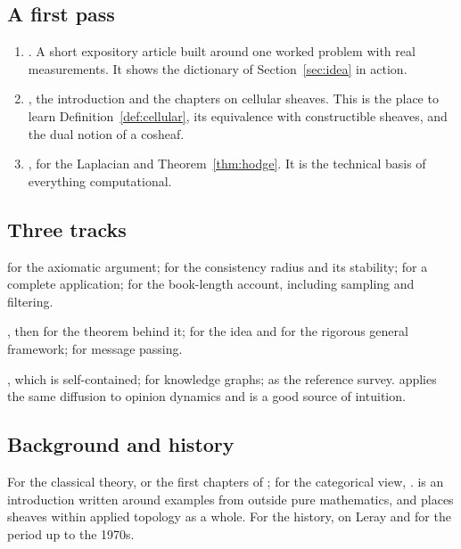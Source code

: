 \documentclass[11pt,a4paper,oneside]{scrartcl}
\theoremstyle{guideplain}
\theoremstyle{guidedef}
\begin{document}
\subsection{A first pass}
\begin{enumerate}
  \item \textcite{robinson2019}. A short expository article built around one worked problem with
        real measurements. It shows the dictionary of Section~\ref{sec:idea} in action.
  \item \textcite{curry2014}, the introduction and the chapters on cellular sheaves. This is the
        place to learn Definition~\ref{def:cellular}, its equivalence with constructible sheaves,
        and the dual notion of a cosheaf.
  \item \textcite{hansen2019}, for the Laplacian and Theorem~\ref{thm:hodge}. It is the technical
        basis of everything computational.
\end{enumerate}

\subsection{Three tracks}
\begin{description}[style=nextline, leftmargin=1.4em, itemsep=.5em]
  \item[Data fusion] \textcite{robinson2017} for the axiomatic argument; \textcite{robinson2020} for
        the consistency radius and its stability; \textcite{joslyn2020} for a complete application;
        \textcite{robinson2014} for the book-length account, including sampling and filtering.
  \item[Information theory] \textcite{abramsky2011}, then \textcite{vorobev1962} for the theorem
        behind it; \textcite{baudot2015} for the idea and \textcite{vigneaux2020} for the rigorous
        general framework; \textcite{peltre2020} for message passing.
  \item[Machine learning] \textcite{bodnar2022}, which is self-contained; \textcite{gebhart2023} for
        knowledge graphs; \textcite{ayzenberg2025} as the reference survey. \textcite{hansen2021}
        applies the same diffusion to opinion dynamics and is a good source of intuition.
\end{description}

\subsection{Background and history}
For the classical theory, \textcite{bredon1997} or the first chapters of \textcite{kashiwara1990};
for the categorical view, \textcite{maclane1992}. \textcite{rosiak2022} is an introduction written
around examples from outside pure mathematics, and \textcite{ghrist2014} places sheaves within
applied topology as a whole. For the history, \textcite{miller2000} on Leray and
\textcite{gray1979} for the period up to the 1970s.
\end{document}
